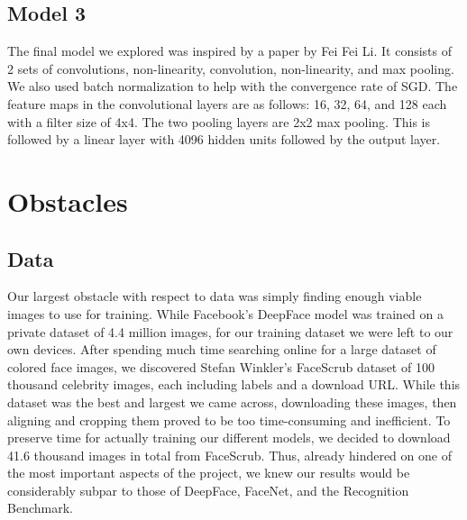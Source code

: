 \documentclass[11pt]{article}
\begin{document}
    \subsection{Model 3}
    The final model we explored was inspired by a paper by Fei Fei Li. It consists of 2 sets of convolutions, non-linearity, convolution, non-linearity, and max pooling. We also used batch normalization to help with the convergence rate of SGD. The feature maps in the convolutional layers are as follows: 16, 32, 64, and 128 each with a filter size of 4x4. The two pooling layers are 2x2 max pooling. This is followed by a linear layer with 4096 hidden units followed by the output layer. 
\section{Obstacles}
    \subsection{Data}
	\par
	Our largest obstacle with respect to data was simply finding enough viable images to use for training. While Facebook's DeepFace model was trained on a private dataset of 4.4 million images, for our training dataset we were left to our own devices. After spending much time searching online for a large dataset of colored face images, we discovered Stefan Winkler's FaceScrub dataset of 100 thousand celebrity images, each including labels and a download URL. While this dataset was the best and largest we came across, downloading these images, then aligning and cropping them proved to be too time-consuming and inefficient. To preserve time for actually training our different models, we decided to download 41.6 thousand images in total from FaceScrub. Thus, already hindered on one of the most important aspects of the project, we knew our results would be considerably subpar to those of DeepFace, FaceNet, and the Recognition Benchmark.  
\end{document}
